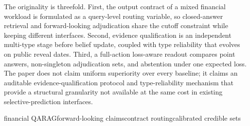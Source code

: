 \documentclass[12pt,openany]{ctexbook}
\begin{document}
{\hspace*{2em}The originality is threefold. First, the output contract of a mixed financial workload is formulated as a query-level routing variable, so closed-answer retrieval and forward-looking adjudication share the cutoff constraint while keeping different interfaces. Second, evidence qualification is an independent multi-type stage before belief update, coupled with type reliability that evolves on public reveal dates. Third, a full-action loss-aware readout compares point answers, non-singleton adjudication sets, and abstention under one expected loss. The paper does not claim uniform superiority over every baseline; it claims an auditable evidence-qualification protocol and type-reliability mechanism that provide a structural granularity not available at the same cost in existing selective-prediction interfaces.\par
}
\vspace{0.4cm}
{\sloppy{} {\arial{}\selectfont financial QA\hspace{0.8em}RAG\hspace{0.8em}forward-looking claims\hspace{0.8em}contract routing\hspace{0.8em}calibrated credible sets}\par}

\clearpage
\tableofcontents
{}
\clearpage
{}
{}
\listoffigures
{}
\clearpage
{}
{}
\listoftables
{}
\clearpage

\mainmatter
{}
\setlength{\parindent}{2em}




\end{document}
